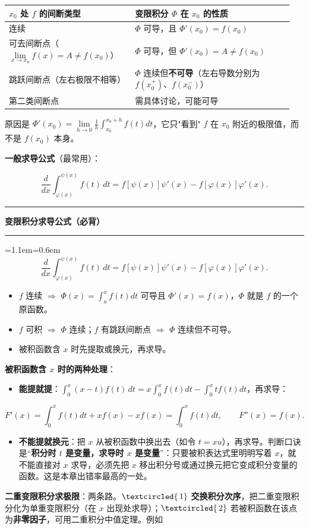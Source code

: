 \documentclass[11pt,openany,UTF8]{ctexbook}
\newcommand{\circled}[1]{\textcircled{\scriptsize\,#1}}
\newcommand{\callouthead}[2]{%
  \par\addvspace{7pt}\noindent
  {\color{#1}\rule[-0.15em]{3pt}{1.05em}}\hspace{0.5em}%
  {\bfseries\color{#1}#2}\par\nobreak\vspace{-0.35em}%
  {\color{rulesep}\hrule height 0.4pt}\nobreak\vspace{0.45em}%
  \begingroup\small\setlength{\parindent}{0pt}%
  \leftskip=1.1em\rightskip=0.6em\noindent\ignorespaces}
\newcommand{\calloutend}{\par\endgroup\addvspace{7pt}}
\newenvironment{callkey}[1]{\callouthead{keybar}{#1}}{\calloutend}
\begin{document}
\begingroup\small\setlength{\tabcolsep}{4.0pt}
\begin{longtable}{@{}L{0.4199\linewidth}L{0.5258\linewidth}@{}}
\toprule
\textbf{$x_0$ 处 $f$ 的间断类型} & \textbf{变限积分 $\Phi$ 在 $x_0$ 的性质} \\
\midrule
\endhead
连续 & $\Phi$ 可导，且 $\Phi'(x_0)=f(x_0)$ \\
可去间断点（$\lim\limits_{x\to x_0}f(x)=A\neq f(x_0)$） & $\Phi$ 可导，但 $\Phi'(x_0)=A\neq f(x_0)$ \\
跳跃间断点（左右极限不相等） & $\Phi$ 连续但\textbf{不可导}（左右导数分别为 $f(x_0^+)$、$f(x_0^-)$） \\
第二类间断点 & 需具体讨论，可能可导 \\
\bottomrule
\end{longtable}
\endgroup

原因是 $\Phi'(x_0)=\lim\limits_{h\to0}\frac{1}{h}\int_{x_0}^{x_0+h}f(t)dt$，它只"看到" $f$ 在 $x_0$ 附近的极限值，而不是 $f(x_0)$ 本身。

\textbf{一般求导公式}（最常用）：

\[\frac{d}{dx}\int_{\varphi(x)}^{\psi(x)}f(t)\,dt=f\!\left[\psi(x)\right]\psi'(x)-f\!\left[\varphi(x)\right]\varphi'(x).\]

\begin{callkey}{变限积分求导公式（必背）}
\[\frac{d}{dx}\int_{\varphi(x)}^{\psi(x)}f(t)\,dt=f\!\left[\psi(x)\right]\psi'(x)-f\!\left[\varphi(x)\right]\varphi'(x).\]

\begin{itemize}
\item $f$ 连续 $\Rightarrow$ $\Phi(x)=\int_a^xf(t)dt$ 可导且 $\Phi'(x)=f(x)$，$\Phi$ 就是 $f$ 的一个原函数。
\item $f$ 可积 $\Rightarrow$ $\Phi$ 连续；$f$ 有跳跃间断点 $\Rightarrow$ $\Phi$ 连续但不可导。
\item 被积函数含 $x$ 时先提取或换元，再求导。
\end{itemize}
\end{callkey}

\textbf{被积函数含 $x$ 时的两种处理}：

\begin{itemize}
\item \textbf{能提就提}：$\displaystyle\int_0^x(x-t)f(t)\,dt=x\int_0^xf(t)dt-\int_0^xtf(t)dt$，再求导：
\end{itemize}
\[F'(x)=\int_0^xf(t)dt+xf(x)-xf(x)=\int_0^xf(t)dt,\qquad F''(x)=f(x).\]

\begin{itemize}
\item \textbf{不能提就换元}：把 $x$ 从被积函数中换出去（如令 $t=xu$），再求导。判断口诀是“\textbf{积分时 $t$ 是变量，求导时 $x$ 是变量}”：只要被积表达式里明明写着 $x$，就不能直接对 $x$ 求导，必须先把 $x$ 移出积分号或通过换元把它变成积分变量的函数。这是本章出错率最高的一处。
\end{itemize}
\textbf{二重变限积分求极限}：两条路。$\circled{1}$ \textbf{交换积分次序}，把二重变限积分化为单重变限积分（在 $x$ 出现处求导）；$\circled{2}$ 若被积函数在该点为\textbf{非零因子}，可用二重积分中值定理。例如
\end{document}
